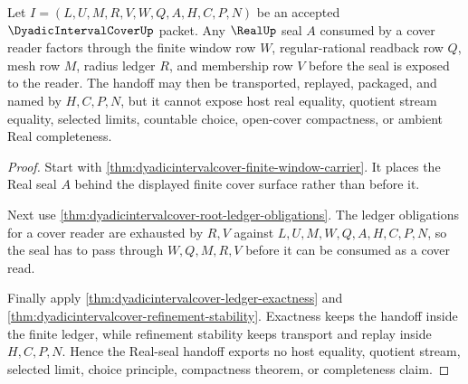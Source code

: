 \begin{theorem}
\label{thm:dyadicintervalcover-real-seal-cover-handoff}
Let $I=(L,U,M,R,V,W,Q,A,H,C,P,N)$ be an accepted $\DyadicIntervalCoverUp$ packet. Any $\RealUp$ seal $A$ consumed by a cover reader factors through the finite window row $W$, regular-rational readback row $Q$, mesh row $M$, radius ledger $R$, and membership row $V$ before the seal is exposed to the reader. The handoff may then be transported, replayed, packaged, and named by $H,C,P,N$, but it cannot expose host real equality, quotient stream equality, selected limits, countable choice, open-cover compactness, or ambient Real completeness.
\end{theorem}
\begin{proof}
Start with \autoref{thm:dyadicintervalcover-finite-window-carrier}. It places the Real seal $A$ behind the displayed finite cover surface rather than before it.

Next use \autoref{thm:dyadicintervalcover-root-ledger-obligations}. The ledger obligations for a cover reader are exhausted by $R,V$ against $L,U,M,W,Q,A,H,C,P,N$, so the seal has to pass through $W,Q,M,R,V$ before it can be consumed as a cover read.

Finally apply \autoref{thm:dyadicintervalcover-ledger-exactness} and \autoref{thm:dyadicintervalcover-refinement-stability}. Exactness keeps the handoff inside the finite ledger, while refinement stability keeps transport and replay inside $H,C,P,N$. Hence the Real-seal handoff exports no host equality, quotient stream, selected limit, choice principle, compactness theorem, or completeness claim.
\end{proof}

